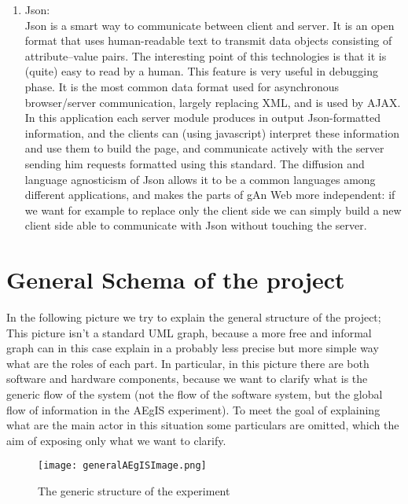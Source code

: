 \begin{enumerate}
\item
Json:
\\
\noindent
Json is a smart way to communicate between client and server.
It is an open format that uses human-readable text to transmit data objects consisting of attribute–value pairs. The interesting point of this technologies is that it is (quite) easy to read by a human. This feature is very useful in debugging phase.  
It is the most common data format used for asynchronous browser/server communication, largely replacing XML, and is used by AJAX. In this application each server module produces in output Json-formatted information, and the clients can (using javascript) interpret these information and use them to build the page, and communicate actively with the server sending him requests formatted using this standard.
The diffusion and language agnosticism of Json allows it to be a common languages among different applications, and makes the parts of gAn Web more independent: if we want for example to replace only the client side we can simply build a new client side able to communicate with Json without touching the server. 

\end{enumerate}  


\section{General Schema of the project}

In the following picture we try to explain the general structure of the project; This picture isn't a standard UML graph, because a more free and informal graph can in this case explain in a probably less precise but more simple way what are the roles of each part. In particular, in this picture there are both software and hardware components, because we want to clarify what is the generic flow of the system (not the flow of the software system, but the global flow of information in the AEgIS experiment). To meet the goal of explaining what are the main actor in this situation some particulars are omitted, which the aim of exposing only what we want to clarify.

\begin{figure}[H]
\centering
\texttt{[image: generalAEgISImage.png]} 
\caption{The generic structure of the experiment}
\end{figure}
   
